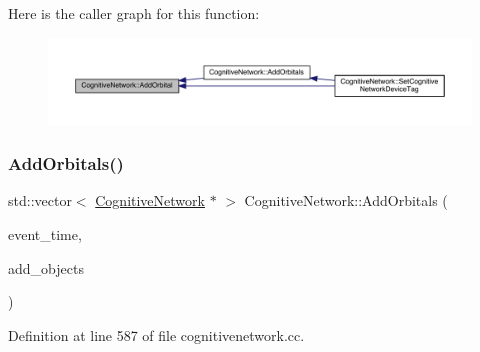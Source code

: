 Here is the caller graph for this function\+:
\nopagebreak
\begin{figure}[H]
\begin{center}
\leavevmode
\includegraphics[width=350pt]{class_cognitive_network_ab6caa285c25568259ae935cf9e746af4_icgraph}
\end{center}
\end{figure}
\mbox{\label{class_cognitive_network_a9dbf4a9fab3b806d2bd6b2701b7a9548}} 
\subsubsection{\texorpdfstring{Add\+Orbitals()}{AddOrbitals()}}
{\footnotesize\ttfamily std\+::vector$<$ \hyperlink{class_cognitive_network}{Cognitive\+Network} $\ast$ $>$ Cognitive\+Network\+::\+Add\+Orbitals (\begin{DoxyParamCaption}\item[{std\+::chrono\+::time\+\_\+point$<$ \hyperlink{universe_8h_a0ef8d951d1ca5ab3cfaf7ab4c7a6fd80}{Clock} $>$}]{event\+\_\+time,  }\item[{std\+::vector$<$ \hyperlink{class_cognitive_network}{Cognitive\+Network} $\ast$$>$}]{add\+\_\+objects }\end{DoxyParamCaption})}



Definition at line 587 of file cognitivenetwork.\+cc.

